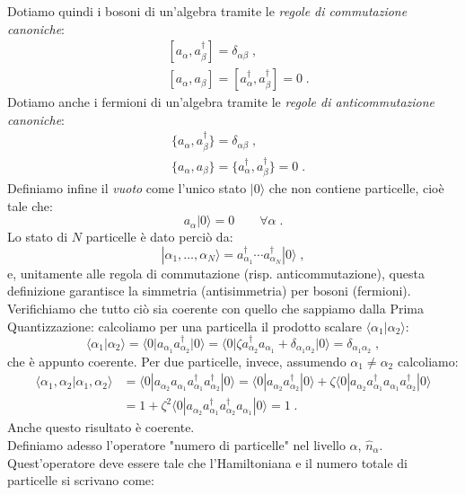 \documentclass[10pt,a4paper]{report}
\theoremstyle{definition}
\numberwithin{equation}{section}
\newcommand{\bra}{\langle}
\newcommand{\ket}{\rangle}
\begin{document}
Dotiamo quindi i bosoni di un'algebra tramite le \emph{regole di commutazione canoniche}:
\begin{align}
&[a_{\alpha},a_{\beta}^{\dagger}]=\delta_{\alpha\beta}\;, \\
&[a_{\alpha},a_{\beta}]=[a_{\alpha}^{\dagger},a_{\beta}^{\dagger}]=0\;.
\end{align}
Dotiamo anche i fermioni di un'algebra tramite le \emph{regole di anticommutazione canoniche}:
\begin{align}
&\{a_{\alpha},a_{\beta}^{\dagger}\}=\delta_{\alpha\beta} \;,\\
&\{a_{\alpha},a_{\beta}\}=\{a_{\alpha}^{\dagger},a_{\beta}^{\dagger}\}=0\;.
\end{align}
Definiamo infine il \emph{vuoto} come l'unico stato $|0\ket$ che non contiene particelle, cioè tale che:
\begin{equation}
a_{\alpha}|0\ket=0\qquad \forall\alpha\;.
\end{equation}
Lo stato di $N$ particelle è dato perciò da:
\begin{equation}
|\alpha_1,\ldots,\alpha_N\ket=a_{\alpha_1}^{\dagger}\cdots a_{\alpha_N}^{\dagger}|0\ket\;,
\end{equation}
e, unitamente alle regola di commutazione (risp. anticommutazione), questa definizione garantisce la simmetria (antisimmetria) per bosoni (fermioni). \\
Verifichiamo che tutto ciò sia coerente con quello che sappiamo dalla Prima Quantizzazione: calcoliamo per una particella il prodotto scalare $\bra \alpha_1|\alpha_2\ket$:
$$
\bra \alpha_1|\alpha_2\ket=\bra 0|a_{\alpha_1}a_{\alpha_2}^{\dagger}|0\ket=\bra 0|\zeta a_{\alpha_2}^{\dagger}a_{\alpha_1}+\delta_{\alpha_1\alpha_2}|0\ket=\delta_{\alpha_1\alpha_2}\;,
$$
che è appunto coerente. Per due particelle, invece, assumendo $\alpha_1\ne \alpha_2$ calcoliamo:
\begin{align*}
\bra \alpha_1,\alpha_2|\alpha_1,\alpha_2\ket &= \bra 0|a_{\alpha_2}a_{\alpha_1}a_{\alpha_1}^{\dagger}a_{\alpha_2}^{\dagger}|0\ket=\bra 0|a_{\alpha_2}a_{\alpha_2}^{\dagger}|0\ket+\zeta\bra 0|a_{\alpha_2}a_{\alpha_1}^{\dagger}a_{\alpha_1}a_{\alpha_2}^{\dagger}|0\ket \\
&=1+ \zeta^2\bra 0|a_{\alpha_2}a_{\alpha_1}^{\dagger}a_{\alpha_2}^{\dagger}a_{\alpha_1}|0\ket=1\;.
\end{align*}
Anche questo risultato è coerente. \\
Definiamo adesso l'operatore "numero di particelle" nel livello $\alpha$, $\hat{n}_{\alpha}$. Quest'operatore deve essere tale che l'Hamiltoniana e il numero totale di particelle si scrivano come:
\end{document}
